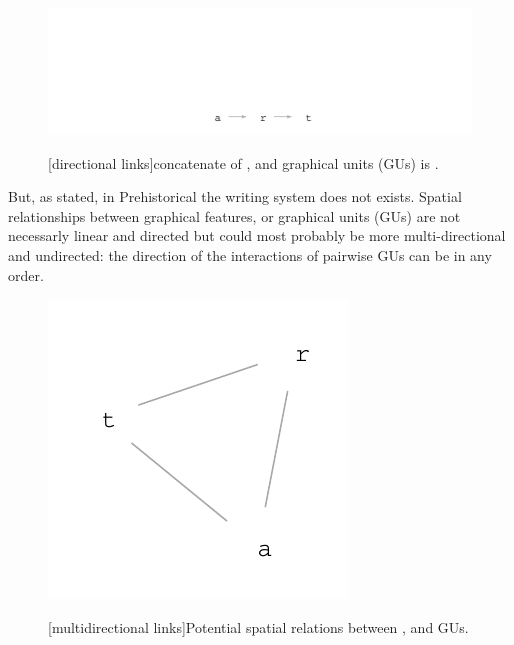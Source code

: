 \documentclass[article]{jss}\usepackage[]{graphicx}\usepackage[]{color}
\makeatletter
\def\maxwidth{ %
  \ifdim\Gin@nat@width>\linewidth
    \linewidth
  \else
    \Gin@nat@width
  \fi
}
\newenvironment{knitrout}{}{} %
\makeatother
\begin{document}
\begin{figure}[H]
\begin{knitrout}
\color{fgcolor}
\includegraphics[width=\maxwidth]{figure/unnamed-chunk-1-1} 

\end{knitrout}
[directional links]{concatenate of ,  and  graphical units (GUs) is .}
\end{figure}

But, as stated, in Prehistorical the writing system does not exists. Spatial relationships between graphical features, or graphical units (GUs) are not necessarly linear and directed but could most probably be more multi-directional and undirected: the direction of the interactions of pairwise GUs can be in any order.  

\begin{figure}[H]
\begin{knitrout}
\color{fgcolor}
\includegraphics[width=\maxwidth]{figure/unnamed-chunk-2-1} 

\end{knitrout}
[multidirectional links]{Potential spatial relations between ,  and  GUs.}
\end{figure}
\end{document}
